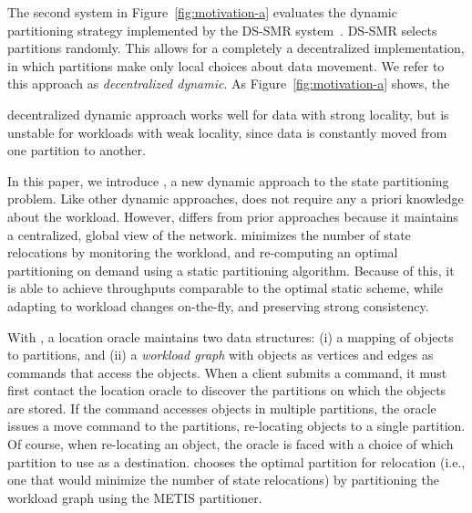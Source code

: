 The second system in Figure~\ref{fig:motivation-a} evaluates the dynamic
partitioning strategy implemented by the DS-SMR system~\cite{hoang2016}.
DS-SMR selects partitions randomly. This allows for a completely a
decentralized implementation, in which partitions make only local
choices about data movement.  We refer to this approach as
\emph{decentralized dynamic}.  As Figure~\ref{fig:motivation-a} shows,
the {decentralized dynamic approach works well for data with strong
  locality, but is unstable for workloads with weak locality, since
  data is constantly moved from one partition to another.


In this paper, we introduce \dynastar, a new dynamic approach to the
state partitioning problem.  Like other dynamic approaches, \dynastar
does not require any a priori knowledge about the workload. However,
\dynastar differs from prior approaches because it maintains a
centralized, global view of the network.  \dynastar minimizes the
number of state relocations by monitoring the workload, and
re-computing an optimal partitioning on demand using a static
partitioning algorithm. Because of this, \dynastar it is able to
achieve throughputs comparable to the optimal static scheme, while
adapting to workload changes on-the-fly, and preserving strong
consistency.


With \dynastar, a location oracle maintains two data structures: (i) a
mapping of objects to partitions, and (ii) a \emph{workload graph}
with objects as vertices and edges as commands that access the
objects.  When a client submits a command, it must first contact the
location oracle to discover the partitions on which the objects are
stored.  If the command accesses objects in multiple partitions, the
oracle issues a move command to the partitions, re-locating objects to
a single partition. Of course, when re-locating an object, the oracle
is faced with a choice of which partition to use as a destination.
\dynastar chooses the optimal partition for relocation (i.e., one that
would minimize the number of state relocations) by partitioning the
workload graph using the METIS partitioner.


}

